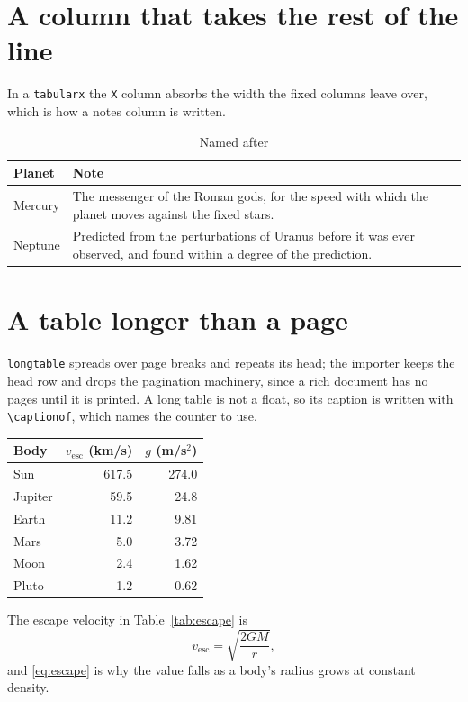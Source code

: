 \documentclass[11pt]{article}
\begin{document}
\section{A column that takes the rest of the line}
In a \texttt{tabularx} the \texttt{X} column absorbs the width the fixed
columns leave over, which is how a notes column is written.

\begin{table}[h]
  \centering
  \caption{Named after}\label{tab:names}
  \begin{tabularx}{\textwidth}{lX}
    \toprule
    Planet & Note \\
    \midrule
    Mercury & The messenger of the Roman gods, for the speed with which the
              planet moves against the fixed stars. \\
    Neptune & Predicted from the perturbations of Uranus before it was ever
              observed, and found within a degree of the prediction. \\
    \bottomrule
  \end{tabularx}
\end{table}

\section{A table longer than a page}
\texttt{longtable} spreads over page breaks and repeats its head; the
importer keeps the head row and drops the pagination machinery, since a
rich document has no pages until it is printed. A long table is not a
float, so its caption is written with \texttt{\textbackslash captionof},
which names the counter to use.

\label{tab:escape}
\begin{longtable}{lrr}
  \toprule
  Body & $v_{\text{esc}}$ (km/s) & $g$ (m/s$^2$) \\
  \midrule
  \endhead
  Sun     & 617.5 & 274.0 \\
  Jupiter & 59.5  & 24.8 \\
  Earth   & 11.2  & 9.81 \\
  Mars    & 5.0   & 3.72 \\
  Moon    & 2.4   & 1.62 \\
  Pluto   & 1.2   & 0.62 \\
  \bottomrule
\end{longtable}

The escape velocity in Table~\ref{tab:escape} is
\begin{equation}\label{eq:escape}
  v_{\text{esc}} = \sqrt{\frac{2GM}{r}},
\end{equation}
and \eqref{eq:escape} is why the value falls as a body's radius grows at
constant density.
\end{document}
